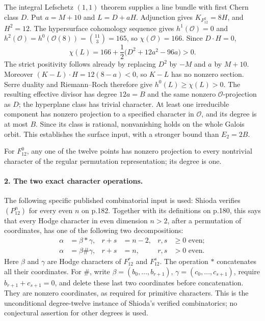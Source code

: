 The integral Lefschetz $(1,1)$ theorem supplies a line bundle
with first Chern class $D$.  Put $a=M+10$ and $L=D+aH$.
Adjunction gives $K_{F_{12}^2}=8H$, and $H^2=12$.
The hypersurface cohomology sequence gives
$h^1(\mathcal O)=0$ and
$h^2(\mathcal O)=h^0(\mathcal O(8))=\binom{11}{3}=165$,
so $\chi(\mathcal O)=166$.
Since $D\cdot H=0$,
\[
 \chi(L)=166+\frac12\bigl(D^2+12a^2-96a\bigr)>0.
\]
The strict positivity follows already by replacing $D^2$ by
$-M$ and $a$ by $M+10$.
Moreover $(K-L)\cdot H=12(8-a)<0$, so $K-L$ has no
nonzero section.  Serre duality and Riemann--Roch therefore
give $h^0(L)\geq\chi(L)>0$.
The resulting effective divisor has degree $12a=B$ and the
same nonzero $\mathcal O$-projection as $D$; the hyperplane
class has trivial character.  At least one irreducible
component has nonzero projection to a specified character in
$\mathcal O$, and its degree is at most $B$.
Since its class is rational, nonvanishing holds on the whole
Galois orbit.  This establishes the surface input, with a
stronger bound than $E_2=2B$.

For $F_{12}^0$, any one of the twelve points has nonzero
projection to every nontrivial character of the regular
permutation representation; its degree is one.

\paragraph{2. The two exact character operations.}
The following specific published combinatorial input is used:
Shioda verifies $(P_{12}^n)$ for every even $n$ on p.182.
Together with its definitions on p.180, this says that every
Hodge character in even dimension $n>2$, after a permutation
of coordinates, has one of the following two decompositions:
\begin{align*}
 \alpha&=\beta*\gamma,
     &r+s&=n-2,&r,s&\geq0\text{ even};\\
 \alpha&=\beta\#\gamma,
     &r+s&=n,&r,s&>0\text{ even}.
\end{align*}
Here $\beta$ and $\gamma$ are Hodge characters of
$F_{12}^r$ and $F_{12}^s$.  The operation $*$ concatenates
all their coordinates.  For $\#$, write
$\beta=(b_0,\ldots,b_{r+1})$,
$\gamma=(c_0,\ldots,c_{s+1})$, require
$b_{r+1}+c_{s+1}=0$, and delete these last two coordinates
before concatenation.  They are nonzero coordinates, as required
for primitive characters.
This is the unconditional degree-twelve instance of Shioda's
verified combinatorics; no conjectural assertion for other
degrees is used.

